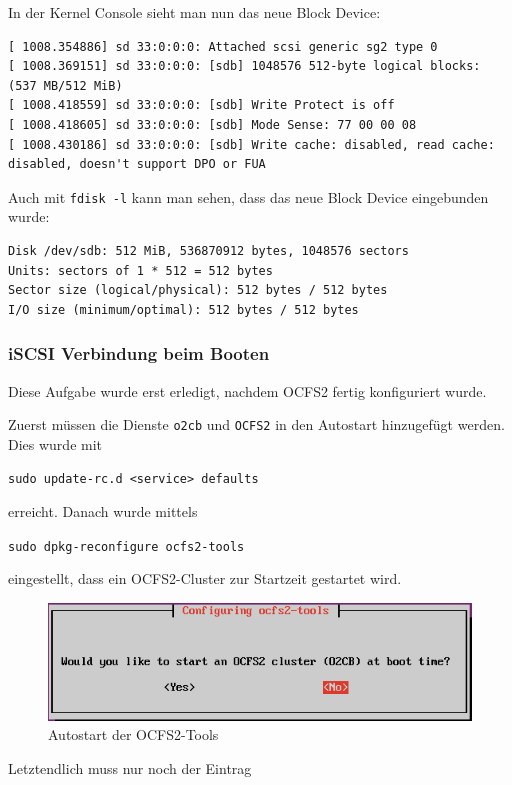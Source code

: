 In der Kernel Console sieht man nun das neue Block Device:
\begin{lstlisting}[style=bash, caption=neues Block Device]
[ 1008.354886] sd 33:0:0:0: Attached scsi generic sg2 type 0
[ 1008.369151] sd 33:0:0:0: [sdb] 1048576 512-byte logical blocks: (537 MB/512 MiB)
[ 1008.418559] sd 33:0:0:0: [sdb] Write Protect is off
[ 1008.418605] sd 33:0:0:0: [sdb] Mode Sense: 77 00 00 08
[ 1008.430186] sd 33:0:0:0: [sdb] Write cache: disabled, read cache: disabled, doesn't support DPO or FUA
\end{lstlisting}

Auch mit \texttt{fdisk -l} kann man sehen, dass das neue Block Device eingebunden wurde:
\begin{lstlisting}[style=bash, caption=\texttt{fdisk -l}]
Disk /dev/sdb: 512 MiB, 536870912 bytes, 1048576 sectors
Units: sectors of 1 * 512 = 512 bytes
Sector size (logical/physical): 512 bytes / 512 bytes
I/O size (minimum/optimal): 512 bytes / 512 bytes
\end{lstlisting}
\subsubsection{iSCSI Verbindung beim Booten}
Diese Aufgabe wurde erst erledigt, nachdem OCFS2 fertig konfiguriert wurde.

Zuerst müssen die Dienste \texttt{o2cb} und \texttt{OCFS2} in den Autostart hinzugefügt werden. Dies wurde mit 

\texttt{sudo update-rc.d <service> defaults}

erreicht. \cite{updaterc}
Danach wurde mittels

\texttt{sudo dpkg-reconfigure ocfs2-tools}

eingestellt, dass ein OCFS2-Cluster zur Startzeit gestartet wird.

\begin{figure}[!h]
	\begin{center}
		\includegraphics[width=0.7\linewidth]{images/boot.png}
		\caption{Autostart der OCFS2-Tools}
		\label{boot}
	\end{center}
\end{figure}

Letztendlich muss nur noch der Eintrag

